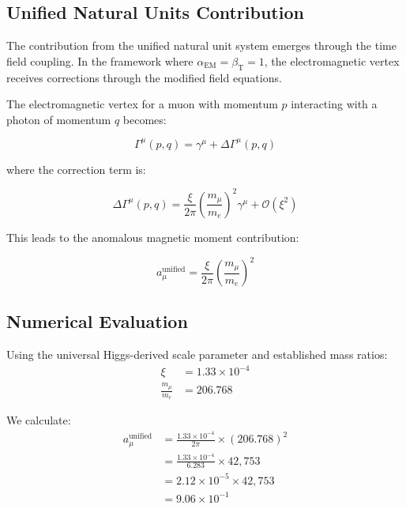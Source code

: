 \documentclass[12pt,a4paper]{article}
\newcommand{\alphaEM}{\alpha_{\text{EM}}}
\newcommand{\betaT}{\beta_{\text{T}}}
\newcommand{\xipar}{\xi}
\begin{document}
	\subsection{Unified Natural Units Contribution}
	
	The contribution from the unified natural unit system emerges through the time field coupling. In the framework where $\alphaEM = \betaT = 1$, the electromagnetic vertex receives corrections through the modified field equations.
	
	The electromagnetic vertex for a muon with momentum $p$ interacting with a photon of momentum $q$ becomes:
	
	\begin{equation}
		\Gamma^{\mu}(p,q) = \gamma^{\mu} + \Delta\Gamma^{\mu}(p,q)
	\end{equation}
	
	where the correction term is:
	
	\begin{equation}
		\Delta\Gamma^{\mu}(p,q) = \frac{\xipar}{2\pi}\left(\frac{m_\mu}{m_e}\right)^2\gamma^{\mu} + \mathcal{O}(\xipar^2)
	\end{equation}
	
	This leads to the anomalous magnetic moment contribution:
	
	\begin{equation}
		a_\mu^{\text{unified}} = \frac{\xipar}{2\pi}\left(\frac{m_\mu}{m_e}\right)^2
	\end{equation}
	
	\subsection{Numerical Evaluation}
	
	Using the universal Higgs-derived scale parameter and established mass ratios:
	\begin{align}
		\xipar &= 1.33 \times 10^{-4} \\
		\frac{m_\mu}{m_e} &= 206.768
	\end{align}
	
	We calculate:
	\begin{align}
		a_\mu^{\text{unified}} &= \frac{1.33 \times 10^{-4}}{2\pi} \times (206.768)^2 \\
		&= \frac{1.33 \times 10^{-4}}{6.283} \times 42,753 \\
		&= 2.12 \times 10^{-5} \times 42,753 \\
		&= 9.06 \times 10^{-1}
	\end{align}
	
\end{document}
